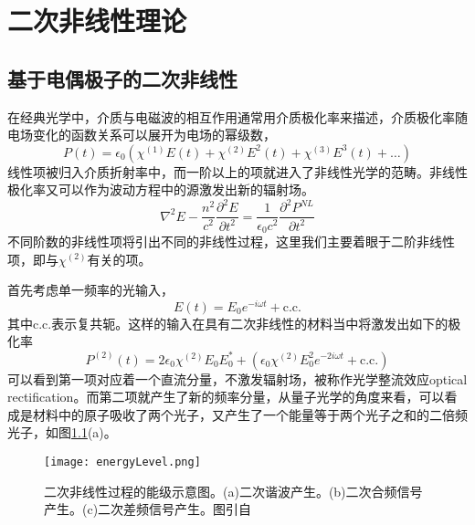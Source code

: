 \chapter{二次非线性理论}
\label{sec:nonlinearTheo}
\section{基于电偶极子的二次非线性}
\label{sec:dipole}
在经典光学中，介质与电磁波的相互作用通常用介质极化率来描述，介质极化率随电场变化的函数关系可以展开为电场的幂级数，
\begin{equation}
P(t) = \epsilon_0(\chi^{(1)}E(t)+\chi^{(2)}E^2(t)+\chi^{(3)}E^3(t)+\dots)
\end{equation}
线性项被归入介质折射率中，而一阶以上的项就进入了非线性光学的范畴。非线性极化率又可以作为波动方程中的源激发出新的辐射场。
\begin{equation}
\nabla^2E-\frac{n^2}{c^2}\frac{\partial^2E}{\partial t^2} = \frac{1}{\epsilon_0c^2}\frac{\partial^2P^{NL}}{\partial t^2}
\label{eq:wave}
\end{equation}
不同阶数的非线性项将引出不同的非线性过程，这里我们主要着眼于二阶非线性项，即与$\chi^{(2)}$有关的项。

首先考虑单一频率的光输入，
\begin{equation}
E(t) = E_0e^{-i\omega t}+\textrm{c.c.} 
\end{equation}
	其中c.c.表示复共轭。这样的输入在具有二次非线性的材料当中将激发出如下的极化率
\begin{equation}
P^{(2)}(t) = 2\epsilon_0\chi^{(2)}E_0E_0^*+(\epsilon_0\chi^{(2)}E_0^2e^{-2i\omega t}+\textrm{c.c.})
\end{equation}
可以看到第一项对应着一个直流分量，不激发辐射场，被称作光学整流效应optical rectification。而第二项就产生了新的频率分量，从量子光学的角度来看，可以看成是材料中的原子吸收了两个光子，又产生了一个能量等于两个光子之和的二倍频光子，如图\ref{pic:energyLevel}(a)。

\begin{figure}
\centering
\texttt{[image: energyLevel.png]}
\caption{二次非线性过程的能级示意图。(a)二次谐波产生。(b)二次合频信号产生。(c)二次差频信号产生。图引自\cite{boyd2003nonlinear}}
\label{pic:energyLevel}
\end{figure}

